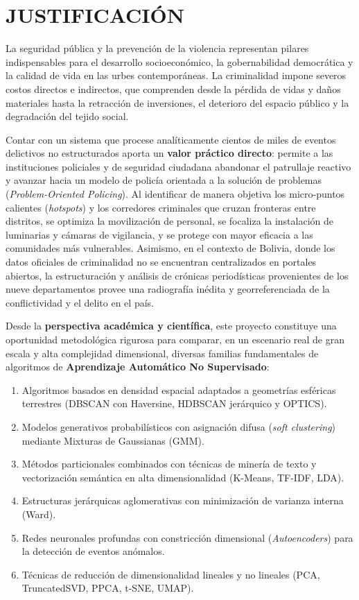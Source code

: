 \section{JUSTIFICACIÓN}

La seguridad pública y la prevención de la violencia representan pilares indispensables para el desarrollo socioeconómico, la gobernabilidad democrática y la calidad de vida en las urbes contemporáneas. La criminalidad impone severos costos directos e indirectos, que comprenden desde la pérdida de vidas y daños materiales hasta la retracción de inversiones, el deterioro del espacio público y la degradación del tejido social.

Contar con un sistema que procese analíticamente cientos de miles de eventos delictivos no estructurados aporta un \textbf{valor práctico directo}: permite a las instituciones policiales y de seguridad ciudadana abandonar el patrullaje reactivo y avanzar hacia un modelo de policía orientada a la solución de problemas (\textit{Problem-Oriented Policing}). Al identificar de manera objetiva los micro-puntos calientes (\textit{hotspots}) y los corredores criminales que cruzan fronteras entre distritos, se optimiza la movilización de personal, se focaliza la instalación de luminarias y cámaras de vigilancia, y se protege con mayor eficacia a las comunidades más vulnerables. Asimismo, en el contexto de Bolivia, donde los datos oficiales de criminalidad no se encuentran centralizados en portales abiertos, la estructuración y análisis de crónicas periodísticas provenientes de los nueve departamentos provee una radiografía inédita y georreferenciada de la conflictividad y el delito en el país.

Desde la \textbf{perspectiva académica y científica}, este proyecto constituye una oportunidad metodológica rigurosa para comparar, en un escenario real de gran escala y alta complejidad dimensional, diversas familias fundamentales de algoritmos de \textbf{Aprendizaje Automático No Supervisado}:
\begin{enumerate}
    \item Algoritmos basados en densidad espacial adaptados a geometrías esféricas terrestres (DBSCAN con Haversine, HDBSCAN jerárquico y OPTICS).
    \item Modelos generativos probabilísticos con asignación difusa (\textit{soft clustering}) mediante Mixturas de Gaussianas (GMM).
    \item Métodos particionales combinados con técnicas de minería de texto y vectorización semántica en alta dimensionalidad (K-Means, TF-IDF, LDA).
    \item Estructuras jerárquicas aglomerativas con minimización de varianza interna (Ward).
    \item Redes neuronales profundas con constricción dimensional (\textit{Autoencoders}) para la detección de eventos anómalos.
    \item Técnicas de reducción de dimensionalidad lineales y no lineales (PCA, TruncatedSVD, PPCA, t-SNE, UMAP).
\end{enumerate}

